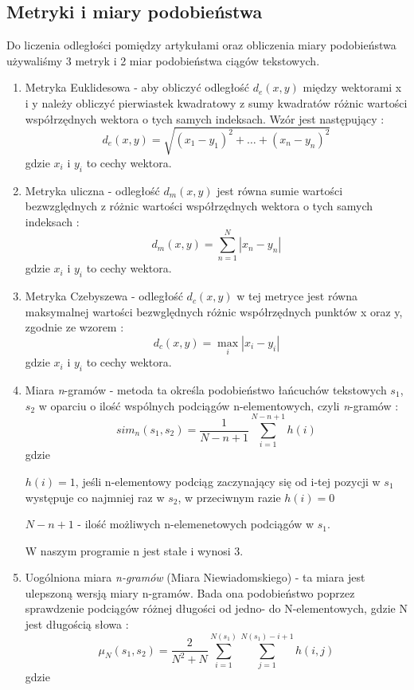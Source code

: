 \documentclass{classrep}
\begin{document}
\subsection{Metryki i miary podobieństwa}
Do liczenia odległości pomiędzy artykułami oraz obliczenia miary podobieństwa używaliśmy 3 metryk i 2 miar podobieństwa ciągów tekstowych.
\begin{enumerate}
\item Metryka Euklidesowa - aby obliczyć odległość $d_e(x,y)$ między wektorami x i y należy obliczyć pierwiastek kwadratowy z sumy kwadratów różnic wartości współrzędnych wektora o tych samych indeksach. Wzór jest następujący \cite{euc}:
\begin{equation} 
d_e(x,y)=\sqrt{(x_1-y_1)^2+\ldots+(x_n-y_n)^2}
\end{equation} gdzie $x_i$ i $y_i$ to cechy wektora.
\item Metryka uliczna - odległość $d_m(x,y)$ jest równa sumie wartości bezwzględnych z różnic wartości współrzędnych wektora o tych samych indeksach \cite{manh}:
\begin{equation} 
d_m(x,y)=\sum_{n=1}^{N} |{x_n-y_n}|
\end{equation} gdzie $x_i$ i $y_i$ to cechy wektora.
\item Metryka Czebyszewa - odległość $d_c(x,y)$ w tej metryce jest równa maksymalnej wartości bezwględnych różnic współrzędnych punktów x oraz y, zgodnie ze wzorem \cite{cze}:
\begin{equation} 
d_c(x,y)=\max_{i} |{x_i-y_i}|
\end{equation} gdzie $x_i$ i $y_i$ to cechy wektora.
\item Miara \textsl{n}-gramów - metoda ta określa podobieństwo łańcuchów tekstowych $s_1$, $s_2$ w oparciu o ilość wspólnych podciągów n-elementowych, czyli \textsl{n}-gramów \cite{wyklad}:
\begin{equation}
sim_n(s_1, s_2) = \frac{1}{N-n+1} \sum_{i=1}^{N-n+1} h(i)
\end{equation} gdzie 

$h(i) = 1$, jeśli n-elementowy podciąg zaczynający się od i-tej pozycji w $s_1$ występuje co najmniej raz w  $s_2$, w przeciwnym razie $h(i) = 0$

$N-n+1$ - ilość możliwych n-elemenetowych podciągów w $s_1$.

W naszym programie n jest stałe i wynosi 3.
\item Uogólniona miara \textsl{n-gramów} (Miara Niewiadomskiego) - ta miara jest ulepszoną wersją miary n-gramów. Bada ona podobieństwo poprzez sprawdzenie podciągów różnej długości od jedno- do N-elementowych, gdzie N jest długością słowa  \cite{wyklad}:
\begin{equation}
\mu_N(s_1, s_2) = \frac{2}{N^2+N} \sum_{i=1}^{N(s_1)} \sum_{j=1}^{N(s_1)-i+1} h(i,j)
\end{equation} gdzie


\end{enumerate}
\end{document}
